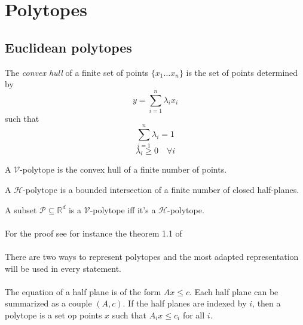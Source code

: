 \cleardoublepage{}

\section{Polytopes}

\subsection{Euclidean polytopes}
\begin{definition}
  The \textit{convex hull} of a finite set of points $\{x_1 \dots x_n\}$ is the set of points determined by
  \[
    y = \sum_{i=1}^n \lambda_i x_i
  \]
  such that
  \[
    \sum_{i=1}^n \lambda_i = 1
  \]
  \[
    \lambda_i \ge 0 \quad \forall i
  \]
\end{definition}

\begin{definition}
  A $\mathcal V$-polytope is the convex hull of a finite number of points.
\end{definition}

\begin{definition}
  A $\mathcal H$-polytope is a bounded intersection of a finite number of closed half-planes.
\end{definition}

\begin{theorem}
  A subset $\mathcal P \subseteq \mathbb R^d$ is a $\mathcal V$-polytope iff it's a $\mathcal H$-polytope.
\end{theorem}

\paragraph{}
For the proof see for instance the theorem 1.1 of~\cite{polytopes}

\paragraph{}
There are two ways to represent polytopes and the most adapted representation will be used in every statement.

\paragraph{}
The equation of a half plane is of the form $Ax \le c$. Each half plane can be summarized as a couple $(A,c)$. If the half planes are indexed by $i$, then a polytope is a set op points $x$ such that $A_i x \le c_i$ for all $i$.

